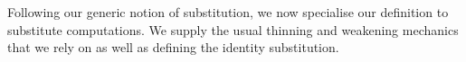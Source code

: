 Following our generic notion of substitution, we now specialise our
definition to substitute computations. We supply the usual thinning
and weakening mechanics that we rely on as well as defining the identity
substitution.
\begin{code}%
\>[0]\AgdaSpace{}%
\AgdaSymbol{:}\AgdaSpace{}%
\AgdaSpace{}%
\AgdaSpace{}%
\AgdaSpace{}%
\AgdaSpace{}%
\<%
\\
\>[0]\AgdaSpace{}%
\AgdaSpace{}%
\AgdaSpace{}%
\AgdaSymbol{=}\AgdaSpace{}%
\AgdaSpace{}%
\AgdaOperator{\AgdaFunction{⇒[}}\AgdaSpace{}%
\AgdaSpace{}%
\AgdaOperator{\AgdaFunction{]}}\AgdaSpace{}%
\<%
\\
%
\\[\AgdaEmptyExtraSkip]%
\>[0]%
\>[6]\AgdaSymbol{:}\AgdaSpace{}%
\AgdaSpace{}%
\AgdaSymbol{(}\AgdaSpace{}%
\AgdaSymbol{)}\<%
\\
\>[0]\AgdaOperator{\AgdaFunction{\AgdaUnderscore{}\textasciicircum{}}}%
\>[6]\AgdaSymbol{:}\AgdaSpace{}%
\AgdaSpace{}%
\AgdaSymbol{(}\AgdaSpace{}%
\AgdaSymbol{)}\<%
\\
\>[0]%
\>[6]\AgdaSymbol{:}\AgdaSpace{}%
\AgdaSpace{}%
\AgdaSpace{}%
\<%
\end{code}
